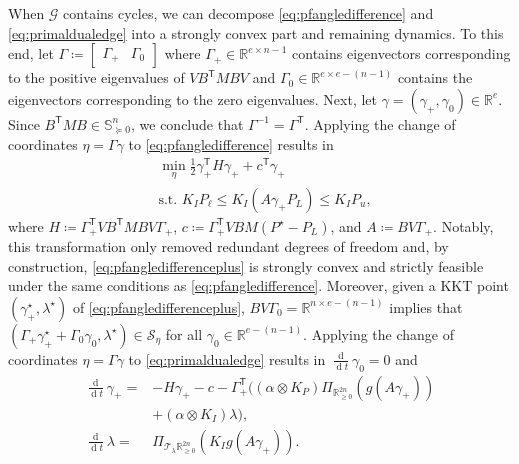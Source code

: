 \documentclass[twocolumn,twoside,journal]{IEEEtran}
\DeclareMathOperator{\diff}{d}
\newcommand{\mc}{\mathcal}
\newcommand{\ddt}{\tfrac{\diff}{\diff \!t}}
\begin{document}
\begin{IEEEproof}
When $\mc G$ contains cycles, we can decompose \eqref{eq:pfangledifference} and \eqref{eq:primaldualedge} into a strongly convex part and remaining dynamics. To this end, let $\Gamma \coloneqq \begin{bmatrix} \Gamma_{+} & \Gamma_{0} \end{bmatrix}$ where $\Gamma_{+}  \in \mathbb{R}^{e \times n-1}$ contains eigenvectors corresponding to the positive eigenvalues of $V B^\mathsf{T} M B V$ and $\Gamma_{0}  \in \mathbb{R}^{e \times e-(n-1)}$ contains the eigenvectors corresponding to the zero eigenvalues. Next, let $\gamma = (\gamma_+,\gamma_0) \in \mathbb{R}^{e}$. Since $B^\mathsf{T} M B \in \mathbb{S}^n_{\succeq 0}$, we conclude that $\Gamma^{-1} =  \Gamma^\mathsf{T}$. Applying the change of coordinates $\eta = \Gamma \gamma$ to \eqref{eq:pfangledifference} results in
%
\begin{subequations}\label{eq:pfangledifferenceplus}
    \begin{align}
        &\min_\eta \frac{1}{2} \gamma_+^\mathsf{T} H \gamma_+ + c^\mathsf{T} \gamma_+   \\ 
        & \text{s.t. }   K_I P_{\ell} \leq K_I (A \gamma_+P_L)  \leq K_I  P_u,
    \end{align}
\end{subequations}
%
where $H\coloneqq\Gamma_+^\mathsf{T} VB^\mathsf{T}MBV \Gamma_+$, $c\coloneqq\Gamma_+^\mathsf{T}VBM(P^\star\!-\!P_L)$,  and $A\coloneqq BV \Gamma_+$. Notably, this transformation only removed redundant degrees of freedom and, by construction, \eqref{eq:pfangledifferenceplus} is strongly convex and strictly feasible under the same conditions as \eqref{eq:pfangledifference}. Moreover, given a KKT point $(\gamma^\star_+,\lambda^\star)$ of \eqref{eq:pfangledifferenceplus}, $BV \Gamma_0 = \mathbb{R}^{n \times e-(n-1)}$ implies that $(\Gamma_+ \gamma^\star_+ + \Gamma_0 \gamma_0,\lambda^\star) \in \mc S_\eta$ for all $\gamma_0 \in \mathbb{R}^{e-(n-1)}$. Applying the change of coordinates $\eta = \Gamma \gamma$ to \eqref{eq:primaldualedge} results in $\ddt \gamma_0 =0$ and 
%
\begin{subequations}\label{eq:primaldualedgeplus}
\begin{align}
    \!\!\ddt \gamma_+=&-\!H \gamma_+ \!-\!c \!-\! \Gamma_+^\mathsf{T} \big( (\alpha \otimes K_{P}) \Pi_{\mathbb{R}^{2n}_{\geq 0}}(g(A \gamma_+)) \nonumber\\
    & +  (\alpha \otimes K_I) \lambda \big),  \\ 
    \ddt \lambda =& \Pi_{\mathcal{T}_{\lambda}{\mathbb{R}^{2n}_{\geq 0} }}\left(K_I g(A\gamma_+)\right).

\end{align}
\end{subequations}
\end{IEEEproof}
\end{document}
